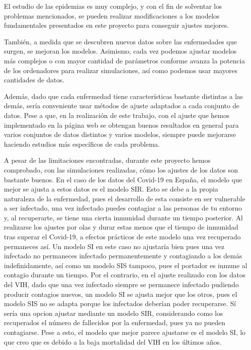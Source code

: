 El estudio de las epidemias es muy complejo, y con el fin de solventar los problemas mencionados, se pueden realizar modificaciones a los modelos fundamentales presentados en este proyecto para conseguir ajustes mejores.

También, a medida que se descubren nuevos datos sobre las enfermedades que surgen, se mejoran los modelos. Asimismo, cada vez podemos ajustar modelos más complejos o con mayor cantidad de parámetros conforme avanza la potencia de los ordenadores para realizar simulaciones, así como podemos usar mayores cantidades de datos.

Además, dado que cada enfermedad tiene características bastante distintas a las demás, sería conveniente usar métodos de ajuste adaptados a cada conjunto de datos. Pese a que, en la realización de este trabajo, con el ajuste que hemos implementado en la página web se obtengan buenos resultados en general para varios conjuntos de datos distintos y varios modelos, siempre puede mejorarse haciendo estudios más específicos de cada problema.

A pesar de las limitaciones encontradas, durante este proyecto hemos comprobado, con las simulaciones realizadas, cómo los ajustes de los datos son bastante buenos. En el caso de los datos del Covid-19 en España, el modelo que mejor se ajusta a estos datos es el modelo SIR. Esto se debe a la propia naturaleza de la enfermedad, pues el desarrollo de esta consiste en ser vulnerable a ser infectado, una vez infectado puedes contagiar a las personas de tu entorno y, al recuperarte, se tiene una cierta inmunidad durante un tiempo posterior. Al realizarse los ajustes por olas y durar estas menos que el tiempo de inmunidad tras superar el Covid-19, a efectos prácticos de este modelo una vez recuperado permaneces así. Un modelo SI en este caso no ajustaría bien pues una vez infectado no permaneces infectado permanentemente y contagiando a los demás indefinidamente, así como un modelo SIS tampoco, pues el portador es inmune al contagio durante un tiempo. Por el contrario, en el ajuste realizado con los datos del VIH, dado que una vez infectado siempre se permanece infectado pudiendo producir contagios nuevos, un modelo SI se ajusta mejor que los otros, pues el modelo SIS no se adapta porque los infectados deberían poder recuperarse. Sí sería una opcion ajustar mediante un modelo SIR, considerando como los recuperados el número de fallecidos por la enfermedad, pues ya no pueden contagiarse. Pese a esto, el modelo que mejor parece ajustarse es el modelo SI, lo que creo que es debido a la baja mortalidad del VIH en los últimos años.

